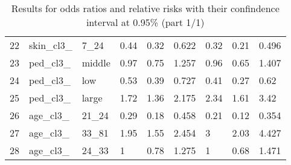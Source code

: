 \documentclass[12pt]{article}
\begin{document}
\begin{table}[ht]
\begin{tabular}{rllllllll}
  22 & skin\_cl3\_ & 7\_24 & 0.44 & 0.32 & 0.622 & 0.32 & 0.21 & 0.496 \\ 
  23 & ped\_cl3\_ & middle & 0.97 & 0.75 & 1.257 & 0.96 & 0.65 & 1.407 \\ 
  24 & ped\_cl3\_ & low & 0.53 & 0.39 & 0.727 & 0.41 & 0.27 & 0.62 \\ 
  25 & ped\_cl3\_ & large & 1.72 & 1.36 & 2.175 & 2.34 & 1.61 & 3.42 \\ 
  26 & age\_cl3\_ & 21\_24 & 0.29 & 0.18 & 0.458 & 0.21 & 0.12 & 0.354 \\ 
  27 & age\_cl3\_ & 33\_81 & 1.95 & 1.55 & 2.454 & 3 & 2.03 & 4.427 \\ 
  28 & age\_cl3\_ & 24\_33 & 1 & 0.78 & 1.275 & 1 & 0.68 & 1.471 \\ 
   \hline
\end{tabular}
\caption{Results for odds ratios and relative risks with their confindence interval at 0.95\% (part 1/1)} 
\label{tab:ro.and.rr.1}
\end{table}
 
\end{document}
